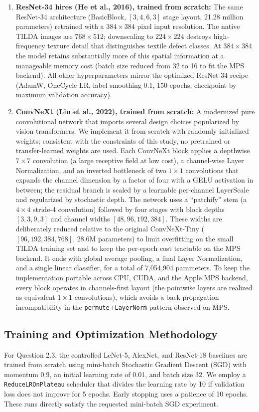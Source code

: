 \documentclass{name}
\begin{document}
\begin{enumerate}
    \item \textbf{ResNet-34 hires (He et al., 2016), trained from scratch:} The same ResNet-34 architecture (BasicBlock, $[3,4,6,3]$ stage layout, 21.28 million parameters) retrained with a $384\times384$ pixel input resolution. The native TILDA images are $768\times512$; downscaling to $224\times224$ destroys high-frequency texture detail that distinguishes textile defect classes. At $384\times384$ the model retains substantially more of this spatial information at a manageable memory cost (batch size reduced from 32 to 16 to fit the MPS backend). All other hyperparameters mirror the optimized ResNet-34 recipe (AdamW, OneCycle LR, label smoothing 0.1, 150 epochs, checkpoint by maximum validation accuracy).
    \item \textbf{ConvNeXt (Liu et al., 2022), trained from scratch:} A modernized pure convolutional network that imports several design choices popularized by vision transformers. We implement it from scratch with randomly initialized weights; consistent with the constraints of this study, no pretrained or transfer-learned weights are used. Each ConvNeXt block applies a depthwise $7 \times 7$ convolution (a large receptive field at low cost), a channel-wise Layer Normalization, and an inverted bottleneck of two $1 \times 1$ convolutions that expands the channel dimension by a factor of four with a GELU activation in between; the residual branch is scaled by a learnable per-channel LayerScale and regularized by stochastic depth. The network uses a ``patchify'' stem (a $4 \times 4$ stride-4 convolution) followed by four stages with block depths $[3,3,9,3]$ and channel widths $[48,96,192,384]$. These widths are deliberately reduced relative to the original ConvNeXt-Tiny ($[96,192,384,768]$, 28.6M parameters) to limit overfitting on the small TILDA training set and to keep the per-epoch cost tractable on the MPS backend. It ends with global average pooling, a final Layer Normalization, and a single linear classifier, for a total of 7,054,904 parameters. To keep the implementation portable across CPU, CUDA, and the Apple MPS backend, every block operates in channels-first layout (the pointwise layers are realized as equivalent $1 \times 1$ convolutions), which avoids a back-propagation incompatibility in the \texttt{permute}+\texttt{LayerNorm} pattern observed on MPS.
\end{enumerate}

\subsection{Training and Optimization Methodology}
For Question 2.3, the controlled LeNet-5, AlexNet, and ResNet-18 baselines are trained from scratch using mini-batch Stochastic Gradient Descent (SGD) with momentum 0.9, an initial learning rate of 0.01, and batch size 32. We employ a \texttt{ReduceLROnPlateau} scheduler that divides the learning rate by 10 if validation loss does not improve for 5 epochs. Early stopping uses a patience of 10 epochs. These runs directly satisfy the requested mini-batch SGD experiment.
\end{document}
